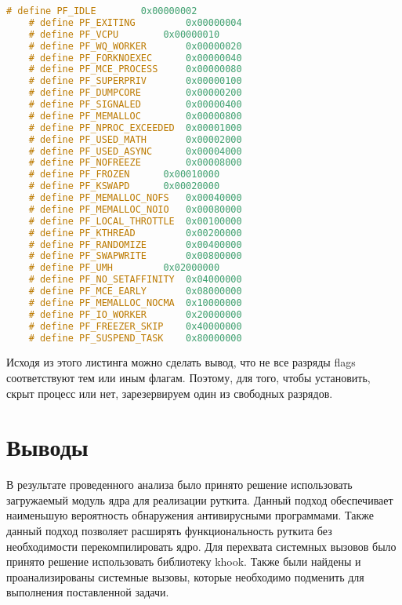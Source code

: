\begin{lstlisting}[label=lst:states, caption=Флаги task\_struct, language=c]
	# define PF_IDLE 		0x00000002
	# define PF_EXITING 		0x00000004
	# define PF_VCPU 		0x00000010
	# define PF_WQ_WORKER 		0x00000020
	# define PF_FORKNOEXEC 		0x00000040
	# define PF_MCE_PROCESS 	0x00000080
	# define PF_SUPERPRIV 		0x00000100
	# define PF_DUMPCORE 		0x00000200
	# define PF_SIGNALED 		0x00000400
	# define PF_MEMALLOC 		0x00000800
	# define PF_NPROC_EXCEEDED 	0x00001000
	# define PF_USED_MATH 		0x00002000
	# define PF_USED_ASYNC 		0x00004000
	# define PF_NOFREEZE 		0x00008000
	# define PF_FROZEN 		0x00010000
	# define PF_KSWAPD 		0x00020000
	# define PF_MEMALLOC_NOFS 	0x00040000
	# define PF_MEMALLOC_NOIO 	0x00080000
	# define PF_LOCAL_THROTTLE 	0x00100000
	# define PF_KTHREAD 		0x00200000
	# define PF_RANDOMIZE 		0x00400000
	# define PF_SWAPWRITE 		0x00800000
	# define PF_UMH 		0x02000000
	# define PF_NO_SETAFFINITY 	0x04000000
	# define PF_MCE_EARLY 		0x08000000
	# define PF_MEMALLOC_NOCMA 	0x10000000
	# define PF_IO_WORKER 		0x20000000
	# define PF_FREEZER_SKIP 	0x40000000
	# define PF_SUSPEND_TASK 	0x80000000
\end{lstlisting}

Исходя из этого листинга можно сделать вывод, что не все разряды flags
соответствуют тем или иным флагам. Поэтому, для того, чтобы установить,
скрыт процесс или нет, зарезервируем один из свободных разрядов.

\section{Выводы}%
\label{sec:vyvody}

В результате проведенного анализа было принято решение использовать загружаемый модуль ядра для реализации руткита. Данный подход обеспечивает наименьшую вероятность обнаружения антивирусными программами. Также данный подход позволяет расширять функциональность руткита без необходимости перекомпилировать ядро. Для перехвата системных вызовов было принято решение использовать библиотеку khook. Также были найдены и проанализированы системные вызовы, которые необходимо подменить для выполнения поставленной задачи.
